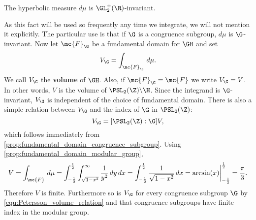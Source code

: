       \begin{proposition}
        The hyperbolic measure $d\mu$ is $\GL_{2}^{+}(\R)$-invariant.
      \end{proposition}

      As this fact will be used so frequently any time we integrate, we will not mention it explicitly. The particular use is that if $\G$ is a congruence subgroup, $d\mu$ is $\G$-invariant. Now let $\mc{F}_{\G}$ be a fundamental domain for $\GH$ and set
      \[
        V_{\G} = \int_{\mc{F}_{\G}}\,d\mu.
      \]
      We call $V_{\G}$ the \textbf{volume} of $\GH$. Also, if $\mc{F}_{\G} = \mc{F}$ we write $V_{\G} = V$. In other words, $V$ is the volume of $\PSL_{2}(\Z)\backslash\H$. Since the integrand is $\G$-invariant, $V_{\G}$ is independent of the choice of fundamental domain. There is also a simple relation between $V_{\G}$ and the index of $\G$ in $\PSL_{2}(\Z)$:
      \begin{equation}\label{equ:Petersson_volume_relation}
        V_{\G} = [\PSL_{2}(\Z):\G]V,
      \end{equation}
      which follows immediately from \cref{prop:fundamental_domain_congruence_subgroup}. Using \cref{prop:fundamental_domain_modular_group},
      \[
        V = \int_{\mc{F}}\,d\mu = \int_{-\frac{1}{2}}^{\frac{1}{2}}\int_{\sqrt{1-x^{2}}}^{\infty}\frac{1}{y^{2}}\,dy\,dx = \int_{-\frac{1}{2}}^{\frac{1}{2}}\frac{1}{\sqrt{1-x^{2}}}\,dx = \arcsin(x)\bigg|_{-\frac{1}{2}}^{\frac{1}{2}} = \frac{\pi}{3}.
      \]
      Therefore $V$ is finite. Furthermore so is $V_{\G}$ for every congruence subgroup $\G$ by \cref{equ:Petersson_volume_relation} and that congruence subgroups have finite index in the modular group.